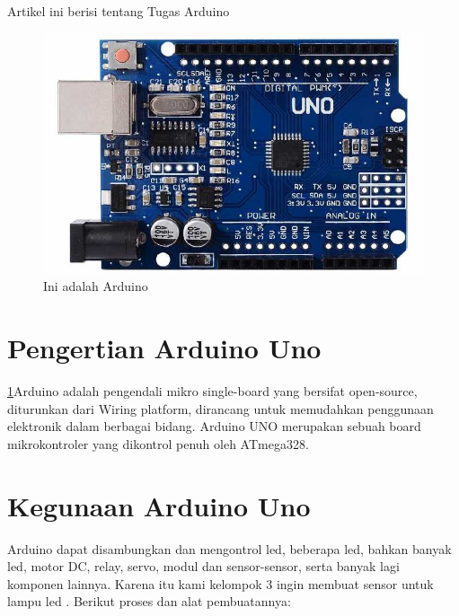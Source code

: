 \documentclass{article}
\begin{document}
Artikel ini berisi tentang Tugas Arduino
	
  \begin{figure}[ht]
  \centerline{\includegraphics[width=1\textwidth]{../figures/arduino10.jpg}}
  \caption{Ini adalah Arduino}
  \label{arduino}
  \end{figure}

\section{Pengertian Arduino Uno}
\ref{arduino}Arduino adalah pengendali mikro single-board yang bersifat open-source, diturunkan dari Wiring platform, dirancang untuk memudahkan penggunaan elektronik dalam berbagai bidang. Arduino UNO merupakan sebuah board mikrokontroler yang dikontrol penuh oleh ATmega328.

\section{Kegunaan Arduino Uno}
Arduino dapat disambungkan dan mengontrol led, beberapa led, bahkan banyak led, motor DC, relay, servo, modul dan sensor-sensor, serta banyak lagi komponen lainnya.
Karena itu kami kelompok 3 ingin membuat sensor untuk lampu led . Berikut proses dan alat pembuatannya:
\end{document}
